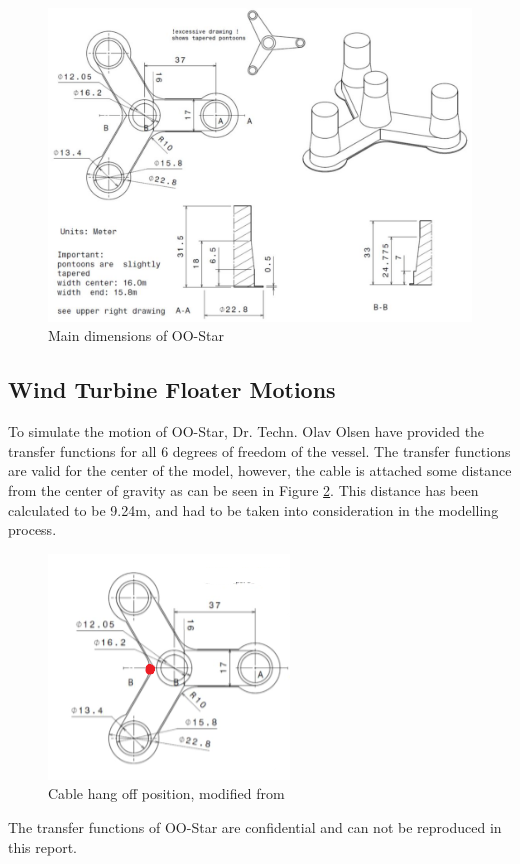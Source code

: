 \begin{figure}[H]
\centering
\includegraphics[scale=0.6]{figures/designoostar}
\caption[$\; \:$Main dimensions of OO-Star]{Main dimensions of OO-Star \cite{Lifes50+D4.2} }
 \label{fig:designoostar}
\end{figure}

\subsection{Wind Turbine Floater Motions}
To simulate the motion of OO-Star, Dr. Techn. Olav Olsen have provided the transfer functions for all 6 degrees of freedom of the vessel. The transfer functions are valid for the center of the model, however, the cable is attached some distance from the center of gravity as can be seen in Figure \ref{fig:cabhang}. This distance has been calculated to be 9.24m, and had to be taken into consideration in the modelling process. 

\begin{figure}[H]
\centering
\includegraphics[scale=1.2]{figures/cabhang}
\caption[$\; \:$Cable hang off position]{Cable hang off position, modified from \cite{Lifes50+D4.2}}
 \label{fig:cabhang}
\end{figure}
 \noindent The transfer functions of OO-Star are confidential and can not be reproduced in this report. 
 
